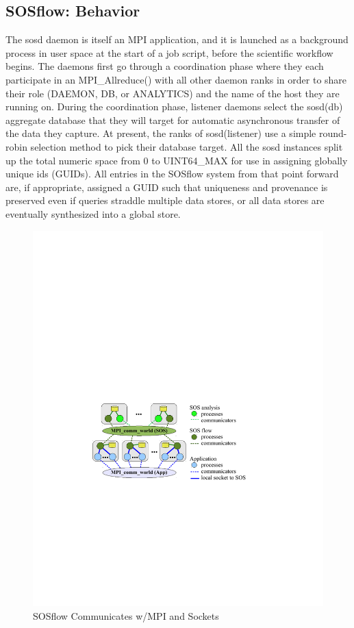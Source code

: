 \subsection{SOSflow: Behavior}
The sosd daemon is itself an MPI application, and it is launched as a
background process in user space at the start of a job script, before
the scientific workflow begins.
%
The daemons first go through a coordination phase where they each
participate in an MPI\_Allreduce() with all other daemon ranks in
order to share their role (DAEMON, DB, or ANALYTICS) and the name of
the host they are running on.
%
During the coordination phase, listener daemons select the sosd(db)
aggregate database that they will target for automatic asynchronous
transfer of the data they capture.
%
At present, the ranks of sosd(listener) use a simple round-robin
selection method to pick their database target.
%
All the sosd instances split up the total numeric space from 0 to
UINT64\_MAX for use in assigning globally unique ids (GUIDs).
%
All entries in the SOSflow system from that point forward are, if
appropriate, assigned a GUID such that uniqueness and provenance is
preserved even if queries straddle multiple data stores, or all data
stores are eventually synthesized into a global store.

\begin{figure}[!t]
  \centering
  \includegraphics[width=5in]{images/sos-mpmd.pdf}
  \caption{SOSflow Communicates w/MPI and Sockets}
  \label{fig_sim}
\end{figure}

